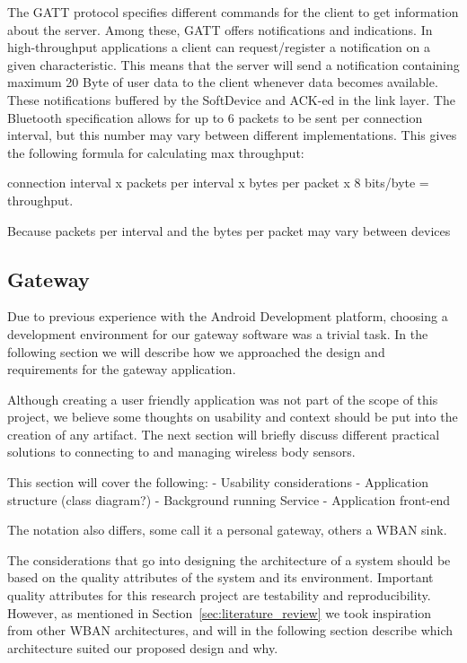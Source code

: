 The GATT protocol specifies different commands for the client to get information about the server. Among these, GATT offers notifications and indications. In high-throughput applications a client can request/register a notification on a given characteristic. This means that the server will send a notification containing maximum 20 Byte of user data to the client whenever data becomes available. These notifications buffered by the SoftDevice and ACK-ed in the link layer. The Bluetooth specification allows for up to 6 packets to be sent per connection interval, but this number may vary between different implementations. This gives the following formula for calculating max throughput:

connection interval x packets per interval x bytes per packet x 8 bits/byte = throughput.

Because packets per interval and the bytes per packet may vary between devices 



\subsection{Gateway} %
\label{sub:gateway}

Due to previous experience with the Android Development platform, choosing a development environment for our gateway software was a trivial task. In the following section we will describe how we approached the design and requirements for the gateway application. 

Although creating a user friendly application was not part of the scope of this project, we believe some thoughts on usability and context should be put into the creation of any artifact. The next section will briefly discuss different practical solutions to connecting to and managing wireless body sensors.

This section will cover the following:
	- Usability considerations
	- Application structure (class diagram?)	
		- Background running Service 
		- Application front-end

The notation also differs, some call it a personal gateway, others a WBAN sink. 

The considerations that go into designing the architecture of a system should be based on the quality attributes of the system and its environment. Important quality attributes for this research project are testability and reproducibility. However, as mentioned in Section~\ref{sec:literature_review} we took inspiration from other WBAN architectures, and will in the following section describe which architecture suited our proposed design and why.


